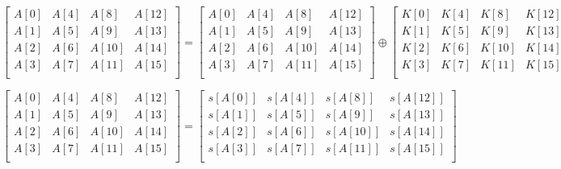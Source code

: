 \documentclass[a4paper,10pt,conference]{IEEEtran}
\begin{document}
\begin{figure}[!t]
\normalsize

\begin{equation}
 \begin{bmatrix}
  A[0] & A[4] & A[8] & A[12] \\
  A[1] & A[5] & A[9] & A[13] \\
  A[2] & A[6] & A[10] & A[14] \\
  A[3] & A[7] & A[11] & A[15] \\
 \end{bmatrix}
 =
 \begin{bmatrix}
  A[0] & A[4] & A[8] & A[12] \\
  A[1] & A[5] & A[9] & A[13] \\
  A[2] & A[6] & A[10] & A[14] \\
  A[3] & A[7] & A[11] & A[15] \\
 \end{bmatrix}
 \oplus
 \begin{bmatrix}
  K[0] & K[4] & K[8] & K[12] \\
  K[1] & K[5] & K[9] & K[13] \\
  K[2] & K[6] & K[10] & K[14] \\
  K[3] & K[7] & K[11] & K[15] \\
 \end{bmatrix}
\label{addroundkey}
\end{equation}

\begin{equation}
 \begin{bmatrix}
  A[0] & A[4] & A[8] & A[12] \\
  A[1] & A[5] & A[9] & A[13] \\
  A[2] & A[6] & A[10] & A[14] \\
  A[3] & A[7] & A[11] & A[15] \\
 \end{bmatrix}
 =
 \begin{bmatrix}
  s[A[0]] & s[A[4]] & s[A[8]] & s[A[12]] \\
  s[A[1]] & s[A[5]] & s[A[9]] & s[A[13]] \\
  s[A[2]] & s[A[6]] & s[A[10]] & s[A[14]] \\
  s[A[3]] & s[A[7]] & s[A[11]] & s[A[15]] \\
 \end{bmatrix}
\label{subbytes}
\end{equation}


\end{figure}
\end{document}
